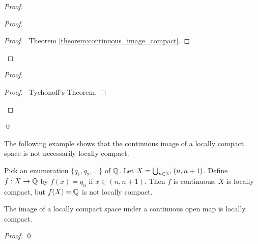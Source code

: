 \begin{proof}
\begin{proof}
        \begin{proof}
            \pf\ Theorem \ref{theorem:continuous_image_compact}.
        \end{proof}
    \end{proof}
    \begin{proof}
        \begin{proof}
            \pf\ Tychonoff's Theorem.
        \end{proof}
    \end{proof}
    \qed
\end{proof}

The following example shows that the continuous image of a locally compact space is not necessarily
locally compact.
\begin{example}
    Pick an enumeration $\{ q_1, q_2, \ldots \}$ of $\mathbb{Q}$. Let $X = \bigcup_{n \in \mathbb{Z}^+} (n, n+1)$.
    Define $f : X \rightarrow \mathbb{Q}$ by $f(x) = q_n$ if $x \in (n, n+1)$. Then $f$ is continuous,
    $X$ is locally compact, but $f(X) = \mathbb{Q}$ is not locally compact.
\end{example}

\begin{proposition}
    \label{proposition:continuous_open_image_locally_compact}
    The image of a locally compact space under a continuous open map is locally compact.
\end{proposition}

\begin{proof}
    \pf
    \qed
\end{proof}

